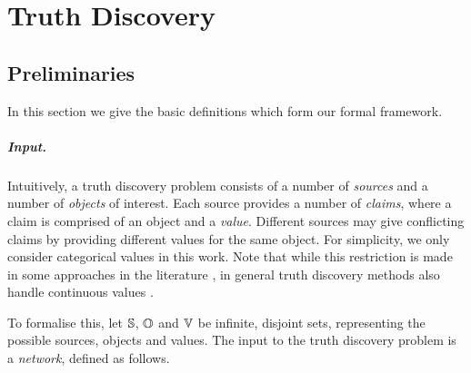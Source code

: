 \chapter{Truth Discovery}


\begin{figure}
    \centering
    \caption{
    }
    \label{td_new_fig_intro_example}
\end{figure}

\section{Preliminaries}
\label{td_new_sec_preliminaries}

In this section we give the basic definitions which form our formal framework.

\paragraph{Input.}

Intuitively, a truth discovery problem consists of a number of \emph{sources}
and a number of \emph{objects} of interest. Each source provides a number of
\emph{claims}, where a claim is comprised of an object and a \emph{value}.
Different sources may give conflicting claims by providing different values for
the same object. For simplicity, we only consider categorical values in this
work. Note that while this restriction is made in some approaches in the
literature , in general truth discovery methods also handle
continuous values .

To formalise this, let $\S$, $\O$ and $\V$ be infinite, disjoint sets,
representing the possible sources, objects and values. The input to the truth
discovery problem is a \emph{network}, defined as follows.

